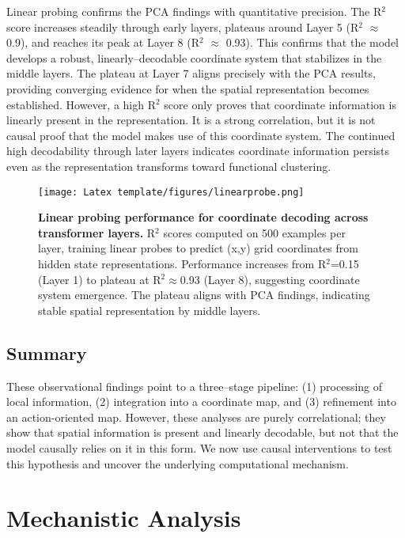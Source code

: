 Linear probing confirms the PCA findings with quantitative precision. The R$^2$ score increases steadily through early layers, plateaus around Layer 5 (R$^2$ $\approx$ 0.9), and reaches its peak at Layer 8 (R$^2$ $\approx$ 0.93). This confirms that the model develops a robust, linearly--decodable coordinate system that stabilizes in the middle layers. The plateau at Layer 7 aligns precisely with the PCA results, providing converging evidence for when the spatial representation becomes established. However, a high R$^2$ score only proves that coordinate information is linearly present in the representation. It is a strong correlation, but it is not causal proof that the model makes use of this coordinate system. The continued high decodability through later layers indicates coordinate information persists even as the representation transforms toward functional clustering.


\begin{figure}[h]
\centering
\texttt{[image: Latex template/figures/linearprobe.png]}
\caption[Linear probing performance for coordinate decoding across transformer layers.]{\textbf{Linear probing performance for coordinate decoding across transformer layers.} R$^2$ scores computed on 500 examples per layer, training linear probes to predict (x,y) grid coordinates from hidden state representations. Performance increases from R$^2$=0.15 (Layer 1) to plateau at R$^2$$\approx$0.93 (Layer 8), suggesting coordinate system emergence. The plateau aligns with PCA findings, indicating stable spatial representation by middle layers.}
\label{fig:linear_probing}
\end{figure}


\subsection{Summary }

These observational findings point to a three--stage pipeline: (1) processing of local information, (2) integration into a coordinate map, and (3) refinement into an action-oriented map. However, these analyses are purely correlational; they show that spatial information is present and linearly decodable, but not that the model causally relies on it in this form. We now use causal interventions to test this hypothesis and uncover the underlying computational mechanism.

\section{Mechanistic Analysis}

